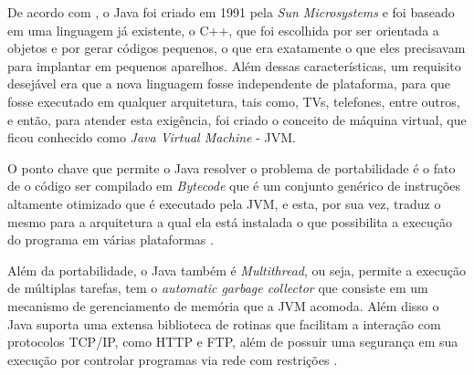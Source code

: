 \par De acordo com , o Java foi
criado em 1991 pela \textit{Sun Microsystems} e foi baseado em uma linguagem já
existente, o C++, que foi escolhida por ser orientada a objetos e
por gerar códigos pequenos, o que era exatamente o que eles precisavam para
implantar em pequenos aparelhos. Além dessas características, um requisito
desejável era que a nova linguagem fosse independente de plataforma, para que
fosse executado em qualquer arquitetura, tais como, TVs, telefones, entre
outros, e então, para atender esta exigência, foi
criado o conceito de máquina virtual, que ficou conhecido como \textit{Java
Virtual Machine} - JVM\footnotemark[2].


\par O ponto chave que
permite o Java resolver o problema de portabilidade é o fato de o código ser
compilado em \textit{Bytecode} que é um conjunto genérico de instruções
altamente otimizado que é executado pela JVM, e esta, por sua vez, traduz o
mesmo para a arquitetura a qual ela está instalada o que possibilita a execução do programa
em várias plataformas \cite{livro_java_complete_references}.


% 
% 
% 


\par Além da portabilidade, o Java também é \textit{Multithread}, ou seja,
permite a execução de múltiplas tarefas, tem o \textit{automatic garbage
collector} que consiste em um mecanismo de gerenciamento de memória que a JVM
acomoda. Além disso o Java suporta uma extensa biblioteca de rotinas que
facilitam a interação com protocolos TCP/IP, como HTTP e FTP, além de possuir uma
segurança em sua execução por controlar programas via rede com
restrições \cite{livro_java_complete_references}.

